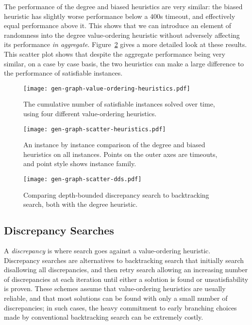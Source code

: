 \documentclass[a4paper,UKenglish]{lipics-v2018}
\newcommand{\Figureref}[1]{Figure~\ref{#1}}
\begin{document}
The performance of the degree and biased heuristics are very similar: the
biased heuristic has slightly worse performance below a 400s timeout, and effectively equal
performance above it. This shows that we can introduce an element of randomness into the degree
value-ordering heuristic without adversely affecting its performance \emph{in aggregate}.
\Figureref{figure:scatter-heuristics} gives a more detailed look at these results. This scatter plot
shows that despite the aggregate performance being very similar, on a case by case basis, the two
heuristics can make a large difference to the performance of satisfiable instances.

\begin{figure}[p]
    \centering
    \texttt{[image: gen-graph-value-ordering-heuristics.pdf]}

    \caption{The cumulative number of satisfiable instances solved over time, using four
    different value-ordering heuristics.}
    \label{figure:value-ordering-heuristics}
\end{figure}

\begin{figure}[p]
    \centering
    \texttt{[image: gen-graph-scatter-heuristics.pdf]}

    \caption{An instance by instance comparison of the degree and biased heuristics on all
    instances. Points on the outer axes are timeouts, and point style shows instance family.}
    \label{figure:scatter-heuristics}
\end{figure}

\begin{figure}[p]
    \centering
    \texttt{[image: gen-graph-scatter-dds.pdf]}

    \caption{Comparing depth-bounded discrepancy search to backtracking search, both with the degree
    heuristic.}\label{figure:scatter-dds}
\end{figure}

\subsection{Discrepancy Searches}

A \emph{discrepancy} is where search goes against a value-ordering heuristic.  Discrepancy searches
\cite{DBLP:conf/ijcai/HarveyG95,DBLP:conf/aaai/Korf96,DBLP:conf/ijcai/Walsh97} are alternatives to
backtracking search that initially search disallowing all discrepancies, and then retry search
allowing an increasing number of discrepancies at each iteration until either a solution is found or
unsatisfiability is proven. These schemes assume that value-ordering heuristics are usually
reliable, and that most solutions can be found with only a small number of discrepancies; in such
cases, the heavy commitment to early branching choices made by conventional backtracking search can
be extremely costly.
\end{document}
